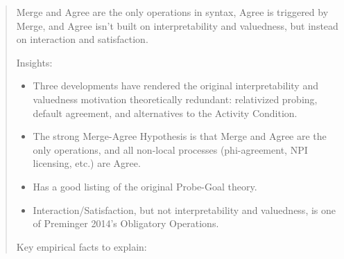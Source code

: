 
\begin{abstract}
Merge and Agree are the only operations in syntax, Agree is triggered by Merge, and Agree isn’t built on interpretability and valuedness, but instead on interaction and satisfaction.

Insights:

\begin{itemize}
  \item Three developments have rendered the original interpretability and valuedness motivation theoretically redundant: relativized probing, default agreement, and alternatives to the Activity Condition.
  \item The strong Merge-Agree Hypothesis is that Merge and Agree are the only operations, and all non-local processes (phi-agreement, NPI licensing, etc.) are Agree.
  \item Has a good listing of the original Probe-Goal theory.
  \item Interaction/Satisfaction, but not interpretability and valuedness, is one of Preminger 2014’s Obligatory Operations.
\end{itemize}

Key empirical facts to explain:


\end{abstract}
